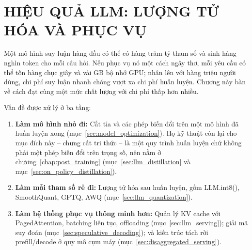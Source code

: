 
\chapter{HIỆU QUẢ LLM: LƯỢNG TỬ HÓA VÀ PHỤC VỤ}
\label{chap:efficiency}

Một mô hình suy luận hàng đầu có thể có hàng trăm tỷ tham số và sinh hàng nghìn token cho mỗi câu hỏi. Nếu phục vụ nó một cách ngây thơ, mỗi yêu cầu có thể tốn hàng chục giây và vài GB bộ nhớ GPU; nhân lên với hàng triệu người dùng, chi phí suy luận nhanh chóng vượt xa chi phí huấn luyện. Chương này bàn về cách đạt cùng một mức chất lượng với chi phí thấp hơn nhiều.

Vấn đề được xử lý ở ba tầng:
\begin{enumerate}
	\item \textbf{Làm mô hình nhỏ đi:} Cắt tỉa và các phép biến đổi trên một mô hình đã huấn luyện xong (mục~\ref{sec:model_optimization}). Họ kỹ thuật còn lại cho mục đích này -- chưng cất tri thức -- là một quy trình huấn luyện chứ không phải một phép biến đổi trên trọng số, nên nằm ở chương~\ref{chap:post_training} (mục~\ref{sec:llm_distillation} và mục~\ref{sec:on_policy_distillation}).
	\item \textbf{Làm mỗi tham số rẻ đi:} Lượng tử hóa sau huấn luyện, gồm LLM.int8(), SmoothQuant, GPTQ, AWQ (mục~\ref{sec:llm_quantization}).
	\item \textbf{Làm hệ thống phục vụ thông minh hơn:} Quản lý KV cache với PagedAttention, batching liên tục, offloading (mục~\ref{sec:llm_serving}); giải mã suy đoán (mục~\ref{sec:speculative_decoding}); và kiến trúc tách rời prefill/decode ở quy mô cụm máy (mục~\ref{sec:disaggregated_serving}).
\end{enumerate}
